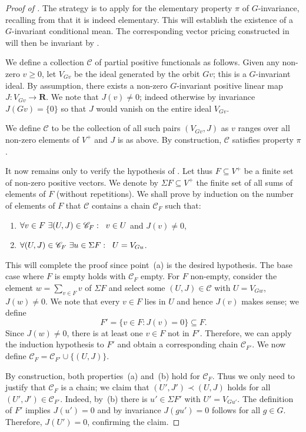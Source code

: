 \documentclass[11pt]{amsart}
\numberwithin{equation}{section}
\theoremstyle{definition}
\theoremstyle{definition}
\newcommand*{\sC}{\mathscr{C}}
\newcommand*{\RR}{\mathbf{R}}
\newcommand*{\se}{\subseteq}
\begin{document}
\begin{proof}[Proof of ]
The strategy is to apply  for the elementary property $\pi$ of $G$-invariance, recalling from  that it is indeed elementary. This will establish the existence of a $G$-invariant conditional mean. The corresponding vector pricing constructed in  will then be invariant by .

\smallskip
We define a collection $\sC$ of partial positive functionals as follows. Given any non-zero $v\geq 0$, let $V_{G v}$ be the ideal generated by the orbit $G v$; this is a $G$-invariant ideal. By assumption, there exists a non-zero $G$-invariant positive linear map $J\colon V_{G v} \to \RR$. We note that $J(v)\neq 0$; indeed otherwise by invariance $J(G v) =\{0\}$ so that $J$ would vanish on the entire ideal $V_{G v}$.

We define $\sC$ to be the collection of all such pairs $(V_{G v}, J)$ as $v$ ranges over all non-zero elements of $V^+$ and $J$ is as above. By construction, $\sC$ satisfies property $\pi$.

It now remains only to verify the hypothesis of . Let thus $F\se V^+$ be a finite set of non-zero positive vectors. We denote by $\Sigma F\se V^+$ the finite set of all sums of elements of $F$ (without repetitions). We shall prove by induction on the number of elements of $F$ that $\sC$ contains a chain $\sC_F$ such that:
\begin{enumerate}[label=\normalfont(\alph*)]
\item $\forall v\in F \ \exists (U, J)\in \sC_F :  \kern2mm v\in U$ and $J(v) \neq 0$,
\item $\forall (U, J)\in \sC_F  \ \exists u\in \Sigma F : \kern2mm U= V_{G u}$.%
\end{enumerate}
This will complete the proof since point~(a) is the desired hypothesis. The base case where $F$ is empty holds with $\sC_F$ empty. For $F$ non-empty, consider the element $w=\sum_{v\in F} v$ of $\Sigma F$ and select some $(U, J)\in \sC$ with $U=V_{G w}$, $J(w)\neq 0$. We note that every $v\in F$ lies in $U$ and hence $J(v)$ makes sense; we define
\begin{equation*}
F' = \big\{ v\in F : J(v)=0\big\} \se F.
\end{equation*}
Since $J(w)\neq 0$, there is at least one $v\in F$ not in $F'$. Therefore, we can apply the induction hypothesis to $F'$ and obtain a corresponding chain $\sC_{F'}$. We now define $\sC_F = \sC_{F'} \cup \{(U,J)\}$.

By construction, both properties~(a) and~(b) hold for $\sC_F$. Thus we only need to justify that $\sC_F$ is a chain; we claim that $(U', J') \prec (U,J)$ holds for all  $(U', J') \in \sC_{F'}$. Indeed, by~(b) there is $u'\in \Sigma F'$ with $U'= V_{G u'}$. The definition of $F'$ implies $J(u')=0$ and by invariance $J(g u')=0$ follows for all $g\in G$. Therefore, $J(U')=0$, confirming the claim.
\end{proof}
\end{document}
